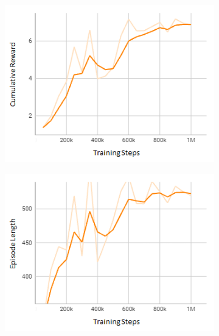 \documentclass[letterpaper, 10 pt, conference]{ieeeconf}  %
\begin{document}
	\begin{figure}[t]
		\centering
		\begin{subfigure}[b]{0.16\linewidth}
			\centering
			\includegraphics[width=\linewidth]{Fig5a.png}
			\caption{}
			\label{fig5a}
		\end{subfigure}
		\hfill
		\begin{subfigure}[b]{0.16\linewidth}
			\centering
			\includegraphics[width=\linewidth]{Fig5b.png}
			\caption{}
			\label{fig5b}
		\end{subfigure}
		\hfill
		\begin{subfigure}[b]{0.16\linewidth}
			\centering

\end{subfigure}
\end{figure}
\end{document}
